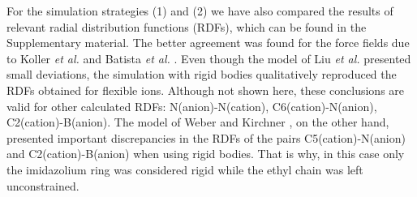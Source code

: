 \documentclass[3p,twocolumn]{elsarticle}
\begin{document}
For the simulation strategies (1) and (2) we have also compared the results of relevant radial distribution functions (RDFs), which can be found in the Supplementary material. The better agreement was found for the force fields due to Koller \textit{et al.} \cite{Koller_2012} and Batista \textit{et al.} \cite{Batista_2015}. Even though the model of Liu \textit{et al.} \cite{Liu_2014} presented small deviations, the simulation with rigid bodies qualitatively reproduced the RDFs obtained for flexible ions. Although not shown here, these conclusions are valid for other calculated RDFs: N(anion)-N(cation), C6(cation)-N(anion), C2(cation)-B(anion). The model of Weber and Kirchner \cite{Weber_2016}, 
on the other hand, presented important discrepancies in the RDFs of the pairs C5(cation)-N(anion) and C2(cation)-B(anion) when using rigid bodies. That is why, in this case only the imidazolium ring was considered rigid while the ethyl chain was left unconstrained. 
\end{document}
